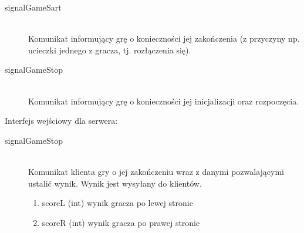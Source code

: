 \begin{description}
	\item[signalGameSart] \hfill \\
	Komunikat informujący grę o konieczności jej zakończenia (z przyczyny np. ucieczki jednego z gracza, tj. rozłączenia się).
\end{description}

\begin{description}
	\item[signalGameStop] \hfill \\
	Komunikat informujący grę o konieczności jej inicjalizacji oraz rozpoczęcia.
\end{description}

Interfejs wejściowy dla serwera:

\begin{description}
	\item[signalGameStop] \hfill \\
	Komunikat klienta gry o jej zakończeniu wraz z danymi pozwalającymi ustalić wynik. Wynik jest wysyłany do klientów.
	\begin{enumerate}
		\item scoreL (int) wynik gracza po lewej stronie
		\item scoreR (int) wynik gracza po prawej stronie
	\end{enumerate}
\end{description}
